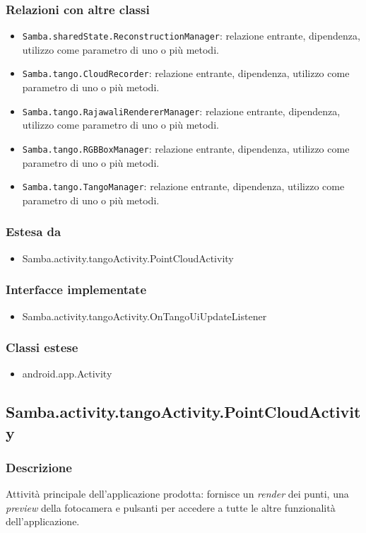 \subsubsection{Relazioni con altre classi}
\begin{itemize}
	\item \texttt{Samba.sharedState.ReconstructionManager}: relazione entrante, dipendenza, utilizzo come parametro di uno o più metodi.
	\item \texttt{Samba.tango.CloudRecorder}: relazione entrante, dipendenza, utilizzo come parametro di uno o più metodi.
	\item \texttt{Samba.tango.RajawaliRendererManager}: relazione entrante, dipendenza, utilizzo come parametro di uno o più metodi.
	\item \texttt{Samba.tango.RGBBoxManager}: relazione entrante, dipendenza, utilizzo come parametro di uno o più metodi.
	\item \texttt{Samba.tango.TangoManager}: relazione entrante, dipendenza, utilizzo come parametro di uno o più metodi.
\end{itemize}
\subsubsection{Estesa da}
\begin{itemize}
	\item Samba.activity.tangoActivity.PointCloudActivity
\end{itemize}
\subsubsection{Interfacce implementate}
\begin{itemize}
	\item Samba.activity.tangoActivity.OnTangoUiUpdateListener
\end{itemize}
\subsubsection{Classi estese}
\begin{itemize}
	\item android.app.Activity
\end{itemize}

\subsection{Samba.activity.tangoActivity.PointCloudActivity}
\subsubsection{Descrizione}
Attività principale dell'applicazione prodotta: fornisce un \emph{render} dei punti, una \emph{preview} della fotocamera e pulsanti per accedere a tutte le altre funzionalità dell'applicazione.\\
